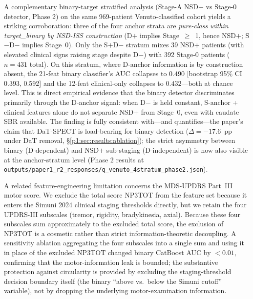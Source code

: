 A complementary binary-target stratified analysis (Stage-A NSD$+$ vs Stage-0 detector, Phase 2) on the same 969-patient Venuto-classified cohort yields a striking corroboration: three of the four anchor strata are \emph{pure-class within target\_binary by NSD-ISS construction} (D$+$ implies Stage~$\geq$~1, hence NSD$+$; S$-$D$-$ implies Stage~0). Only the S$+$D$-$ stratum mixes 39 NSD$+$ patients (with elevated clinical signs raising stage despite D$-$) with 392 Stage-0 patients ($n{=}431$ total). On this stratum, where D-anchor information is by construction absent, the 21-feat binary classifier's AUC collapses to $0.490$ [bootstrap 95\% CI 0.393, 0.592] and the 12-feat clinical-only collapses to $0.432$---both at chance level. This is direct empirical evidence that the binary detector discriminates primarily through the D-anchor signal: when D$-$ is held constant, S-anchor + clinical features alone do not separate NSD$+$ from Stage~0, even with caudate SBR available. The finding is fully consistent with---and quantifies---the paper's claim that DaT-SPECT is load-bearing for binary detection ($\Delta{=}{-}17.6$~pp under DaT removal, \S\ref{p1:sec:results:ablation}); the strict asymmetry between binary (D-dependent) and NSD$+$ sub-staging (D-independent) is now also visible at the anchor-stratum level (Phase 2 results at \texttt{outputs/paper1\_r2\_responses/q\_venuto\_4stratum\_phase2.json}).

A related feature-engineering limitation concerns the MDS-UPDRS Part~III motor score. We exclude the total score NP3TOT from the feature set because it enters the Simuni 2024 clinical staging thresholds directly, but we retain the four UPDRS-III subscales (tremor, rigidity, bradykinesia, axial). Because these four subscales sum approximately to the excluded total score, the exclusion of NP3TOT is a cosmetic rather than strict information-theoretic decoupling. A sensitivity ablation aggregating the four subscales into a single sum and using it in place of the excluded NP3TOT changed binary CatBoost AUC by ${<}0.01$, confirming that the motor-information leak is bounded; the substantive protection against circularity is provided by excluding the staging-threshold decision boundary itself (the binary ``above vs.\ below the Simuni cutoff'' variable), not by dropping the underlying motor-examination information.

